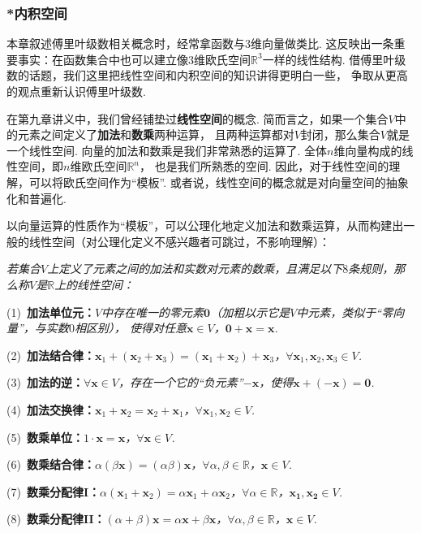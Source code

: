 \subsubsection{*内积空间}

本章叙述傅里叶级数相关概念时，经常拿函数与$3$维向量做类比.
这反映出一条重要事实：在函数集合中也可以建立像$3$维欧氏空间$\mathbb{R}^3$一样的线性结构.
借傅里叶级数的话题，我们这里把线性空间和内积空间的知识讲得更明白一些，
争取从更高的观点重新认识傅里叶级数.

在第九章讲义中，我们曾经铺垫过\textbf{线性空间}的概念.
简而言之，如果一个集合$V$中的元素之间定义了\textbf{加法}和\textbf{数乘}两种运算，
且两种运算都对$V$封闭，那么集合$V$就是一个线性空间.
向量的加法和数乘是我们非常熟悉的运算了.
全体$n$维向量构成的线性空间，即$n$维欧氏空间$\mathbb{R}^n$，
也是我们所熟悉的空间.
因此，对于线性空间的理解，可以将欧氏空间作为“模板”.
或者说，线性空间的概念就是对向量空间的抽象化和普遍化.

以向量运算的性质作为“模板”，可以公理化地定义加法和数乘运算，从而构建出一般的线性空间（对公理化定义不感兴趣者可跳过，不影响理解）：\vspace{1em}

\textit{若集合$V$上定义了元素之间的加法和实数对元素的数乘，且满足以下$8$条规则，那么称$V$是$\mathbb{R}$上的线性空间：}

(1)~\textbf{加法单位元：}\textit{$V$中存在唯一的零元素$\bm{0}$（加粗以示它是$V$中元素，类似于“零向量”，与实数$0$相区别），
使得对任意$\bm{x} \in V$，$\bm{0} + \bm{x} = \bm{x}$. }

(2)~\textbf{加法结合律：}\textit{$\bm{x}_1 +( \bm{x}_2 + \bm{x}_3) = (\bm{x}_1 + \bm{x}_2) + \bm{x}_3$，$\forall \bm{x}_1,\bm{x}_2, \bm{x}_3 \in V$.}

(3)~\textbf{加法的逆：}\textit{$\forall \bm{x} \in V$，存在一个它的“负元素”$-\bm{x}$，使得$\bm{x}+(-\bm{x}) = \bm{0}$.}

(4)~\textbf{加法交换律：}\textit{$\bm{x}_1 + \bm{x}_2 = \bm{x}_2 + \bm{x}_1$，$\forall \bm{x}_1,\bm{x}_2 \in V$.}

(5)~\textbf{数乘单位：}\textit{$1 \cdot \bm{x} = \bm{x}$，$\forall \bm{x} \in V$.}

(6)~\textbf{数乘结合律：}\textit{$\alpha(\beta \bm{x}) = (\alpha \beta)\bm{x}$，$\forall \alpha,\beta \in \mathbb{R}$，$\bm{x} \in V$.}

(7)~\textbf{数乘分配律I：}\textit{$\alpha (\bm{x}_1 + \bm{x}_2) = \alpha \bm{x}_1 + \alpha \bm{x}_2$，$\forall \alpha \in \mathbb{R}$，$\bm{x_1},\bm{x_2} \in V$.}

(8)~\textbf{数乘分配律II：}\textit{$(\alpha + \beta)\bm{x} = \alpha \bm{x} + \beta \bm{x}$，$\forall \alpha,\beta \in \mathbb{R}$，$\bm{x} \in V$.}\vspace{1em}

